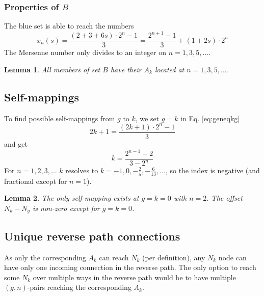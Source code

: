 \documentclass[10pt,a4paper]{article}
\newtheorem{lemma}{Lemma}
\begin{document}
\subsubsection{Properties of $B$}
The blue set is able to reach the numbers
\begin{equation}
	x_n(s)=\frac{(2+3+6s)\cdot2^n - 1}{3} = \frac{2^{n+1} - 1}{3} + (1+2s)\cdot 2^n
\end{equation}
The Mersenne number only divides to an integer on $n=1,3,5,\ldots$.
\begin{lemma}
All members of set $B$ have their $A_k$ located at $n=1,3,5,\ldots$.
\label{lemma:AkofB}
\end{lemma}

\subsection{Self-mappings}
To find possible self-mappings from $g$ to $k$, we set $g=k$ in Eq. \ref{eq:geneqkg}
\begin{equation}
	2k+1=\frac{(2k+1)\cdot2^n - 1}{3}
\end{equation}
and get
\begin{equation}
	k=\frac{2^{n-1} - 2}{3-2^n}
\end{equation}
For $n=1,2,3,\ldots$ $k$ resolves to $k=-1,0,-\frac{2}{5},-\frac{6}{13},\ldots$, so the index is negative (and fractional except for $n=1$).
\begin{lemma}
The only self-mapping exists at $g=k=0$ with $n=2$. The offset $N_k-N_g$ is non-zero except for $g=k=0$.
\label{lemma:selfmapping}
\end{lemma}

\subsection{Unique reverse path connections}
As only the corresponding $A_k$ can reach $N_k$ (per definition), any $N_k$ node can have only one incoming connection in the reverse path. The only option to reach some $N_k$ over multiple ways in the reverse path would be to have multiple $(g,n)$-pairs reaching the corresponding $A_k$.
\end{document}
